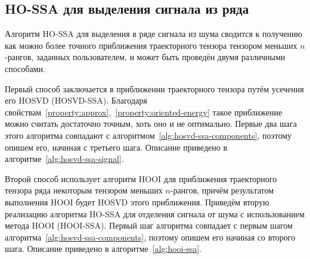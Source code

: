 \documentclass[specialist,
    substylefile = spbu.rtx,
    subf,href,colorlinks=true, 12pt]{disser}
\theoremstyle{plain}
\theoremstyle{definition}
\theoremstyle{remark}
\begin{document}
    \subsection{HO-SSA для выделения сигнала из ряда}\label{subsec:ho-ssa-signal}
    Алгоритм HO-SSA для выделения в ряде сигнала из шума сводится к получению
    как можно более точного приближения траекторного тензора тензором меньших $n$-рангов, заданных пользователем, и
    может быть проведён двумя различными способами.

    Первый способ заключается в приближении траекторного тензора путём усечения его HOSVD (HOSVD-SSA).
    Благодаря свойствам~\ref{property:approx},~\ref{property:oriented-energy} такое приближение можно считать достаточно точным,
    хоть оно и не оптимально.
    Первые два шага этого алгоритма совпадают с алгоритмом~\ref{alg:hosvd-ssa-components}, поэтому опишем его, начиная с третьего шага.
    Описание приведено в алгоритме~\ref{alg:hosvd-ssa-signal}.

    Второй способ использует алгоритм HOOI для приближения траекторного тензора ряда некоторым тензором 
    меньших $n$-рангов, причём результатом выполнения HOOI будет HOSVD этого приближения.
    Приведём вторую реализацию алгоритма HO-SSA для отделения сигнала от шума с использованием метода HOOI (HOOI-SSA).
    Первый шаг алгоритма совпадает с первым шагом алгоритма~\ref{alg:hosvd-ssa-components},
    поэтому опишем его начиная со второго шага.
    Описание приведено в алгоритме~\ref{alg:hooi-ssa}.
    
\end{document}
